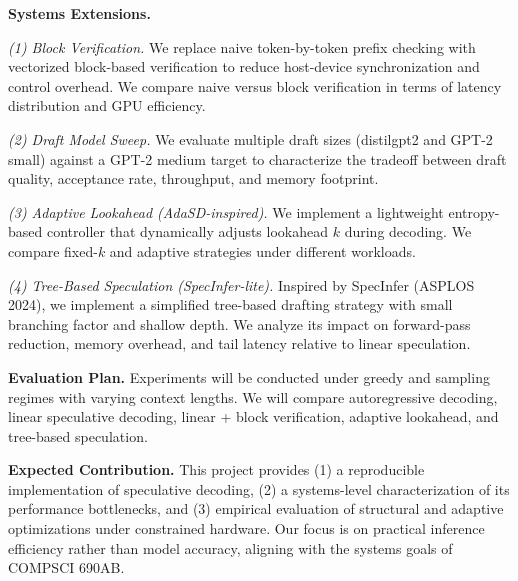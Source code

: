 \documentclass[11pt]{article}
\begin{document}
\noindent\textbf{Systems Extensions.}

\textit{(1) Block Verification.}
We replace naive token-by-token prefix checking with vectorized block-based verification to reduce host-device synchronization and control overhead. We compare naive versus block verification in terms of latency distribution and GPU efficiency.

\textit{(2) Draft Model Sweep.}
We evaluate multiple draft sizes (distilgpt2 and GPT-2 small) against a GPT-2 medium target to characterize the tradeoff between draft quality, acceptance rate, throughput, and memory footprint.

\textit{(3) Adaptive Lookahead (AdaSD-inspired).}
We implement a lightweight entropy-based controller that dynamically adjusts lookahead $k$ during decoding. We compare fixed-$k$ and adaptive strategies under different workloads.

\textit{(4) Tree-Based Speculation (SpecInfer-lite).}
Inspired by SpecInfer (ASPLOS 2024), we implement a simplified tree-based drafting strategy with small branching factor and shallow depth. We analyze its impact on forward-pass reduction, memory overhead, and tail latency relative to linear speculation.

\noindent\textbf{Evaluation Plan.}
Experiments will be conducted under greedy and sampling regimes with varying context lengths. We will compare autoregressive decoding, linear speculative decoding, linear + block verification, adaptive lookahead, and tree-based speculation.

\noindent\textbf{Expected Contribution.}
This project provides (1) a reproducible implementation of speculative decoding, (2) a systems-level characterization of its performance bottlenecks, and (3) empirical evaluation of structural and adaptive optimizations under constrained hardware. Our focus is on practical inference efficiency rather than model accuracy, aligning with the systems goals of COMPSCI 690AB.
\enlargethispage{1\baselineskip}
\end{document}
